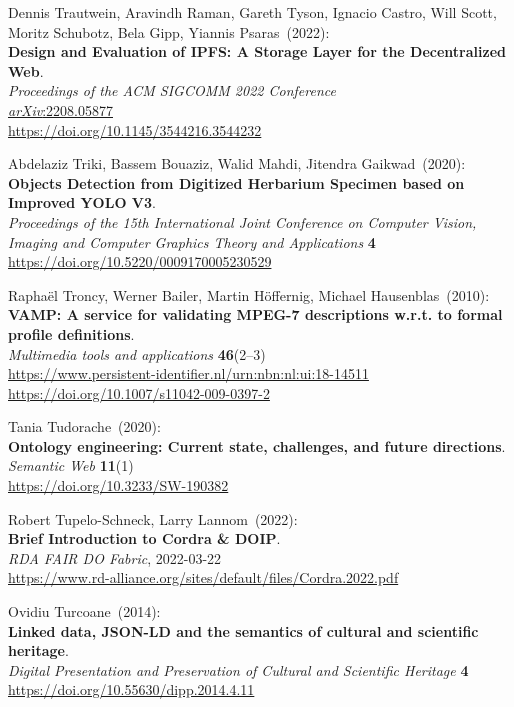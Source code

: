 \begin{thebibliography}{9}
Dennis Trautwein, Aravindh Raman, Gareth Tyson, Ignacio Castro, Will Scott, Moritz Schubotz, Bela Gipp, Yiannis Psaras~(2022): \\
\textbf{Design and Evaluation of IPFS: A Storage Layer for the Decentralized Web}.\\
\emph{Proceedings of the {ACM} {SIGCOMM} 2022 Conference}\\
\href{https://doi.org/10.48550/arXiv.2208.05877}{\emph{arXiv}:2208.05877}\\
\url{https://doi.org/10.1145/3544216.3544232}

Abdelaziz Triki, Bassem Bouaziz, Walid Mahdi, Jitendra Gaikwad~(2020): \\
\textbf{Objects Detection from Digitized Herbarium Specimen based on Improved YOLO V3}.\\
\emph{Proceedings of the 15th International Joint Conference on Computer Vision, Imaging and Computer Graphics Theory and Applications} 
\textbf{4}\\
\url{https://doi.org/10.5220/0009170005230529}

Raphaël Troncy, Werner Bailer, Martin Höffernig, Michael Hausenblas~(2010): \\
\textbf{VAMP: A service for validating MPEG-7 descriptions w.r.t. to formal profile definitions}.\\
\emph{Multimedia tools and applications} \textbf{46}(2--3) \\
\url{https://www.persistent-identifier.nl/urn:nbn:nl:ui:18-14511}\\
\url{https://doi.org/10.1007/s11042-009-0397-2}

Tania Tudorache~(2020): \\
\textbf{Ontology engineering: Current state, challenges, and future directions}.\\
\emph{Semantic Web} \textbf{11}(1)\\
\url{https://doi.org/10.3233/SW-190382}

Robert Tupelo-Schneck, Larry Lannom~(2022): \\
\textbf{Brief Introduction to Cordra \& DOIP}.\\
\emph{RDA FAIR DO Fabric}, 2022-03-22\\
\url{https://www.rd-alliance.org/sites/default/files/Cordra.2022.pdf}

Ovidiu Turcoane~(2014): \\
\textbf{Linked data, {JSON-LD} and the semantics of cultural and scientific heritage}. \\
\emph{Digital Presentation and Preservation of Cultural and Scientific Heritage} \textbf{4} \\
\url{https://doi.org/10.55630/dipp.2014.4.11}


\end{thebibliography}
